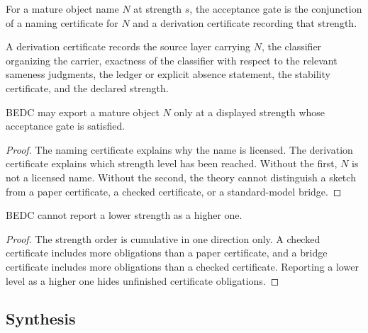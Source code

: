 \begin{definition}
\label{def:philosophy-acceptance-gate}
For a mature object name \(N\) at strength \(s\), the acceptance gate
is the conjunction of a naming certificate for \(N\) and a derivation
certificate recording that strength.
\end{definition}

\begin{definition}
\label{def:philosophy-derivation-certificate}
A derivation certificate records the source layer carrying \(N\), the
classifier organizing the carrier, exactness of the classifier with
respect to the relevant sameness judgments, the ledger or explicit
absence statement, the stability certificate, and the declared
strength.
\end{definition}

\begin{theorem}
\label{thm:philosophy-object-export-acceptance-gate}
BEDC may export a mature object \(N\) only at a displayed strength
whose acceptance gate is satisfied.
\end{theorem}
\begin{proof}
The naming certificate explains why the name is licensed. The
derivation certificate explains which strength level has been reached.
Without the first, \(N\) is not a licensed name. Without the second, the
theory cannot distinguish a sketch from a paper certificate, a checked
certificate, or a standard-model bridge.
\end{proof}

\begin{corollary}
\label{cor:philosophy-no-strength-inflation}
BEDC cannot report a lower strength as a higher one.
\end{corollary}
\begin{proof}
The strength order is cumulative in one direction only. A checked
certificate includes more obligations than a paper certificate, and a
bridge certificate includes more obligations than a checked
certificate. Reporting a lower level as a higher one hides unfinished
certificate obligations.
\end{proof}

\subsection{Synthesis}
\label{subsec:philosophy-object-knowledge-namecert-synthesis}

